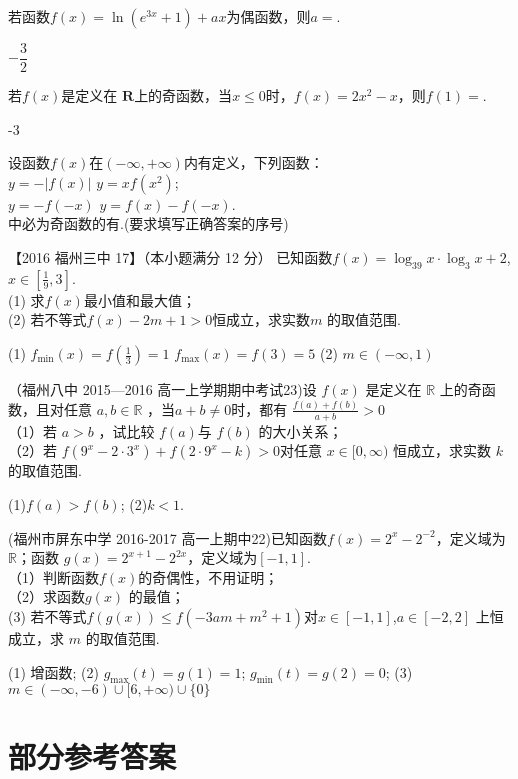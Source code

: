 \begin{exercise}
      若函数$f(x)=\ln (e^{3x}+1)+ax$为偶函数，则$ a= $\tk.
      \begin{answer}
        $-\dfrac{3}2$
      \end{answer}
    \item
      若$f(x)$是定义在 $\mathbf{R} $上的奇函数，当$ x\le0 $时，$f(x)=2x^2-x$，则$f(1)=$\tk.
      \begin{answer}
        -3
      \end{answer}
    \item
      设函数$f(x)$在$ \left(-\infty,+\infty\right) $内有定义，下列函数：\\
       $ y=-\left|f(x)\right| $\qquad{} $ y=xf(x^2) $;\\
       $ y=-f(-x) $\qquad {} $ y=f(x)-f(-x) $.\\
      中必为奇函数的有\tk.(要求填写正确答案的序号)
      \begin{answer}
      \end{answer}
    \item
      【2016 福州三中 17】（本小题满分 12 分）
      已知函数$f(x)=\log_39x\cdot\log_3x+2 $,$x\in[\frac19,3]$.\\
      (1) 求$f(x)$最小值和最大值；\\
      (2) 若不等式$f(x)-2m+1>0 $恒成立，求实数$m$ 的取值范围.
      \begin{answer}
        (1) $f_{\min}(x)=f(\frac13)=1$
              $f_{\max}(x)=f(3)=5$
        (2) $m\in(-\infty,1)$
      \end{answer}
    \vspace{22em}
    \item
      （福州八中 2015—2016 高一上学期期中考试23)设 $f (x )$ 是定义在 $\mathbb{R}$ 上的奇函数，且对任意 $a,b\in \mathbb{R}$ ，当$a+b\neq0$时，都有 $\frac{f(a)+f(b)}{a+b}>0$\\
      （1）若 $a> b$ ，试比较 $f (a ) $与 $f (b)$ 的大小关系；\\
      （2）若 $f (9^x- 2\cdot 3^x )+ f ( 2\cdot 9^x-k )> 0 $对任意 $x\in[0,\infty )$ 恒成立，求实数 $k$ 的取值范围.
      \begin{answer}
      (1)$f(a)>f(b)$;
      (2)$k<1$.
      \end{answer}
    \vspace{22em}
    \item
      (福州市屏东中学 2016-2017 高一上期中22)已知函数$f(x)=2^x-2^{-2} $，定义域为$\mathbb{R} $；函数 $g(x)=2^{x+1}-2^{2x} $，定义域为$[-1,1] $.\\
      （1）判断函数$f(x) $的奇偶性，不用证明；\\
      （2）求函数$g(x) $ 的最值；\\
       (3) 若不等式$f(g(x))\leq f(-3am+m^2+1) $对$x\in[-1,1] $,$a\in[-2,2] $ 上恒成立，求 $m$ 的取值范围.
       \begin{answer}
       (1) 增函数; (2) $g_{\max}(t)=g(1)=1 $; $g_{\min}(t)=g(2)=0 $; (3) $m\in (-\infty,-6)\cup[6,+\infty)\cup\{0\} $
      \end{answer}
      \vspace{20em}
  \end{exercise}
\stopexercise
\newpage
\section{部分参考答案}
\printanswer
